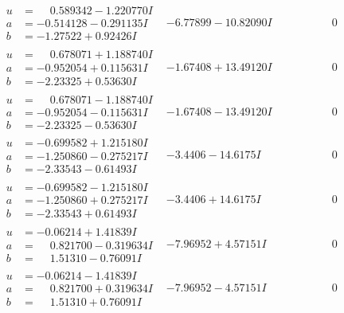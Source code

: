 \documentclass[1p]{elsarticle_modified}
\theoremstyle{definition}
\begin{document}
$$\begin{array}{c|c|c}
\begin{aligned}
u &= \phantom{-}0.589342 - 1.220770 I \\
a &= -0.514128 - 0.291135 I \\
b &= -1.27522 + 0.92426 I\end{aligned}
 & -6.77899 - 10.82090 I & \phantom{-0.000000 } 0 \\ \hline\begin{aligned}
u &= \phantom{-}0.678071 + 1.188740 I \\
a &= -0.952054 + 0.115631 I \\
b &= -2.23325 + 0.53630 I\end{aligned}
 & -1.67408 + 13.49120 I & \phantom{-0.000000 } 0 \\ \hline\begin{aligned}
u &= \phantom{-}0.678071 - 1.188740 I \\
a &= -0.952054 - 0.115631 I \\
b &= -2.23325 - 0.53630 I\end{aligned}
 & -1.67408 - 13.49120 I & \phantom{-0.000000 } 0 \\ \hline\begin{aligned}
u &= -0.699582 + 1.215180 I \\
a &= -1.250860 - 0.275217 I \\
b &= -2.33543 - 0.61493 I\end{aligned}
 & -3.4406 - 14.6175 I & \phantom{-0.000000 } 0 \\ \hline\begin{aligned}
u &= -0.699582 - 1.215180 I \\
a &= -1.250860 + 0.275217 I \\
b &= -2.33543 + 0.61493 I\end{aligned}
 & -3.4406 + 14.6175 I & \phantom{-0.000000 } 0 \\ \hline\begin{aligned}
u &= -0.06214 + 1.41839 I \\
a &= \phantom{-}0.821700 - 0.319634 I \\
b &= \phantom{-}1.51310 - 0.76091 I\end{aligned}
 & -7.96952 + 4.57151 I & \phantom{-0.000000 } 0 \\ \hline\begin{aligned}
u &= -0.06214 - 1.41839 I \\
a &= \phantom{-}0.821700 + 0.319634 I \\
b &= \phantom{-}1.51310 + 0.76091 I\end{aligned}
 & -7.96952 - 4.57151 I & \phantom{-0.000000 } 0 \\ \hline\begin{aligned}

\end{aligned}
\end{array}$$
\end{document}
